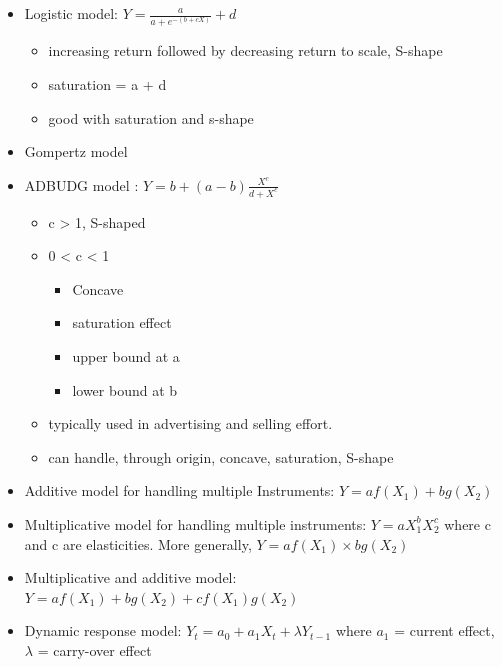 \documentclass[
]{book}
\begin{document}
\begin{itemize}
  \begin{itemize}
  \item
    Decreasing returns and saturation
  \item
    upper bound = a + c
  \item
    lower bound = c
  \item
    typically used in selling effort
  \end{itemize}
\item
  Logistic model: \(Y = \frac{a}{a+ e^{-(b+cX)}}+d\)

  \begin{itemize}
  \item
    increasing return followed by decreasing return to scale, S-shape
  \item
    saturation = a + d
  \item
    good with saturation and s-shape
  \end{itemize}
\item
  Gompertz model
\item
  ADBUDG model \citep{Little_1970} : \(Y = b + (a-b)\frac{X^c}{d + X^c}\)

  \begin{itemize}
  \item
    c \textgreater{} 1, S-shaped
  \item
    0 \textless{} c \textless{} 1

    \begin{itemize}
    \item
      Concave
    \item
      saturation effect
    \item
      upper bound at a
    \item
      lower bound at b
    \end{itemize}
  \item
    typically used in advertising and selling effort.
  \item
    can handle, through origin, concave, saturation, S-shape
  \end{itemize}
\item
  Additive model for handling multiple Instruments: \(Y = af(X_1) + bg(X_2)\)
\item
  Multiplicative model for handling multiple instruments: \(Y = aX_1^b X_2^c\) where c and c are elasticities. More generally, \(Y = af(X_1)\times bg(X_2)\)
\item
  Multiplicative and additive model: \(Y = af(X_1) + bg(X_2) + cf(X_1) g(X_2)\)
\item
  Dynamic response model: \(Y_t = a_0 + a_1 X_t + \lambda Y_{t-1}\) where \(a_1\) = current effect, \(\lambda\) = carry-over effect
\end{itemize}
\end{document}
